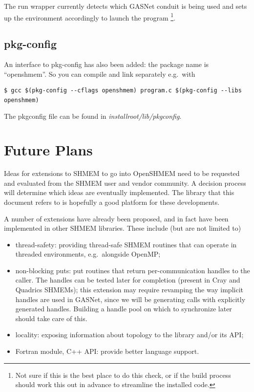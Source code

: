 \documentclass[english]{article}
\newcommand{\openshmem} {\mbox{OpenSHMEM}\xspace}
\begin{document}
The run wrapper currently detects which GASNet conduit is being used
and sets up the environment accordingly to launch the program
\footnote{Not sure if this is the best place to do this check, or if
  the build process should work this out in advance to streamline the
  installed code.}.

\subsection{pkg-config}

An interface to pkg-config has also been added: the package name is
``openshmem''.  So you can compile and link separately e.g.\ with

\begin{lstlisting}
$ gcc $(pkg-config --cflags openshmem) program.c $(pkg-config --libs openshmem)
\end{lstlisting}

The pkgconfig file can be found in \emph{installroot/lib/pkgconfig}.

\section{Future Plans}

Ideas for extensions to SHMEM to go into \openshmem need to be
requested and evaluated from the SHMEM user and vendor community. A
decision process will determine which ideas are eventually
implemented. The library that this document refers to is hopefully a
good platform for these developments.

A number of extensions have already been proposed, and in fact have
been implemented in other SHMEM libraries. These include (but are not
limited to)

\begin{itemize}
\item thread-safety: providing thread-safe SHMEM routines that can
operate in threaded environments, e.g.\ alongside OpenMP;
\item non-blocking puts: put routines that return per-communication
handles to the caller. The handles can be tested later for completion
(present in Cray and Quadrics SHMEMs); this extension may require
revamping the way implicit handles are used in GASNet, since we will
be generating calls with explicitly generated handles. Building a
handle pool on which to synchronize later should take care of this.
\item locality: exposing information about topology to the library
and/or its API;
\item Fortran module, C++ API: provide better language support.
\end{itemize}
\end{document}
